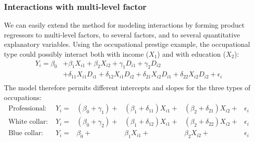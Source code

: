 \subsubsection*{Interactions with multi-level factor}
We can easily extend the method for modeling interactions by forming product regressors to multi-level factors, to several factors, and to several quantitative explanatory variables.
Using the occupational prestige example, the occupational type could possibly interact both with income ($X_1$) and with education ($X_2$):
$$
\begin{aligned}
Y_i = \beta_0 &+ \beta_1 X_{i1} + \beta_2 X_{i2} + \gamma_1 D_{i1} + \gamma_2 D_{i2} \\
 &+\delta_{11} X_{i1} D_{i1} +\delta_{12} X_{i1} D_{i2} +\delta_{21} X_{i2} D_{i1} +\delta_{22} X_{i2} D_{i2} + \epsilon_i\\
\end{aligned}
$$
The model therefore permits different intercepts and slopes for the three types of occupations:
$$
\begin{array}{lrrrrr}
\mbox{Professional: } & Y_i = &(\beta_0 + \gamma_1) + &(\beta_1 + \delta_{11}) X_{i1} +& (\beta_2 + \delta_{21}) X_{i2}  +&\epsilon_i\\
\mbox{White collar: } & Y_i = &(\beta_0 + \gamma_2) + &(\beta_1 + \delta_{12}) X_{i1} +& (\beta_2 + \delta_{22}) X_{i2}  +&\epsilon_i\\
\mbox{Blue collar: } & Y_i = &\beta_0 + &\beta_1 X_{i1}+ & \beta_2 X_{i2}  +&\epsilon_i\\
\end{array}
$$












